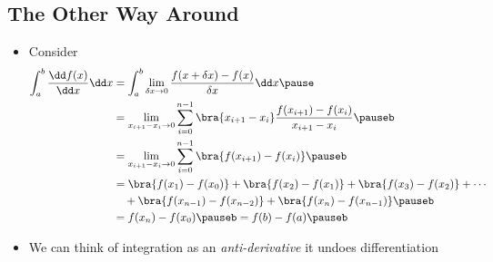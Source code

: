 \begin{slide}
 \section[-2]{The Other Way Around}

  \begin{PauseHighLight}
  \begin{itemize}
  \item Consider
    {\small
    \begin{align*}
      \int_a^b \frac{\dd f(x)}{\dd x} \dd x
      &= \int_a^b  \lim_{\delta x\rightarrow 0} \frac{f(x+\delta x) -
        f(x)}{\delta x} \dd x \pause\\
      &= \lim_{x_{i+1}-x_i\rightarrow 0}  \sum_{i=0}^{n-1} \bra{x_{i+1}- x_i} \frac{f(x_{i+1})
        - f(x_i)}{x_{i+1}- x_i}\pauseb\\
      &=  \lim_{x_{i+1}-x_i\rightarrow 0}  \sum_{i=0}^{n-1} \bra{f(x_{i+1})
        - f(x_i)}\pauseb\\
      &= \bra{f(x_1)- f(x_0)} + \bra{f(x_2)- f(x_1)} + \bra{f(x_3)-
        f(x_2)} + \cdots \\
      & \quad + \bra{f(x_{n-1})- f(x_{n-2})} + \bra{f(x_n)-
        f(x_{n-1})} \pauseb \\
      &= f(x_n) - f(x_0)\pauseb = f(b) -f(a)\pauseb
    \end{align*}}
  \item We can think of integration as an \emph{anti-derivative} it
    undoes differentiation\pauseb
  \end{itemize}
\end{PauseHighLight}

\end{slide}


